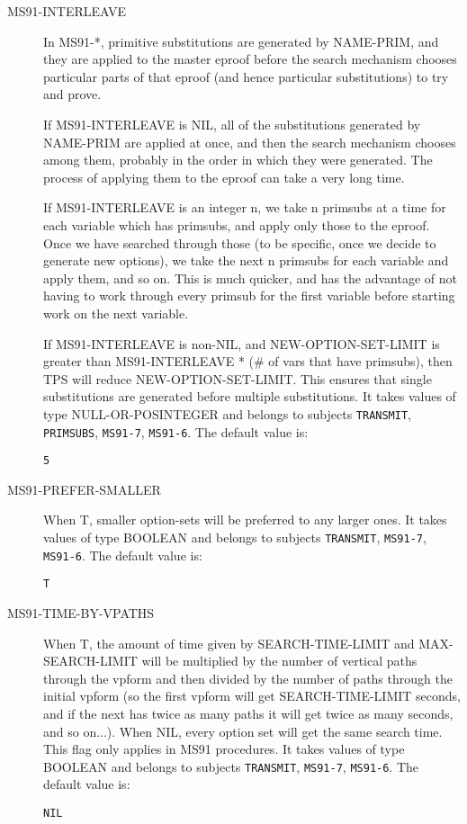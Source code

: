 \begin{description} 
\item[MS91-INTERLEAVE]  
In MS91-*, primitive substitutions are generated by NAME-PRIM,
and they are applied to the master eproof before the search mechanism 
chooses particular parts of that eproof (and hence particular 
substitutions) to try and prove.

If MS91-INTERLEAVE is NIL, all of the substitutions generated by NAME-PRIM
are applied at once, and then the search mechanism chooses among them, probably
in the order in which they were generated. The process of applying them to
the eproof can take a very long time.

If MS91-INTERLEAVE is an integer n, we take n primsubs at a time for each 
variable which has primsubs, and apply only those to the eproof. Once we
have searched through those (to be specific, once we decide to generate new
options), we take the next n primsubs for each variable and apply them, 
and so on. This is much quicker, and has the advantage of not having to 
work through every primsub for the first variable before starting work on 
the next variable.

If MS91-INTERLEAVE is non-NIL, and NEW-OPTION-SET-LIMIT is greater than
MS91-INTERLEAVE * (\#  of vars that have primsubs), then TPS will reduce 
NEW-OPTION-SET-LIMIT. This ensures that single substitutions are 
generated before multiple substitutions.
It takes values of type NULL-OR-POSINTEGER and belongs to subjects \texttt{TRANSMIT}, \texttt{PRIMSUBS}, \texttt{MS91-7}, \texttt{MS91-6}.  The default value is: \begin{lstlisting}
5
\end{lstlisting}

\item[MS91-PREFER-SMALLER]  
When T, smaller option-sets will be preferred to any larger ones.
It takes values of type BOOLEAN and belongs to subjects \texttt{TRANSMIT}, \texttt{MS91-7}, \texttt{MS91-6}.  The default value is: \begin{lstlisting}
T
\end{lstlisting}

\item[MS91-TIME-BY-VPATHS]  
When T, the amount of time given by SEARCH-TIME-LIMIT and 
MAX-SEARCH-LIMIT will be multiplied by the number of vertical paths
through the vpform and then divided by the number of paths through 
the initial vpform (so the first vpform will get SEARCH-TIME-LIMIT
seconds, and if the next has twice as many paths it will get twice
as many seconds, and so on...).
When NIL, every option set will get the same search time.
This flag only applies in MS91 procedures.
It takes values of type BOOLEAN and belongs to subjects \texttt{TRANSMIT}, \texttt{MS91-7}, \texttt{MS91-6}.  The default value is: \begin{lstlisting}
NIL
\end{lstlisting}


\end{description}
